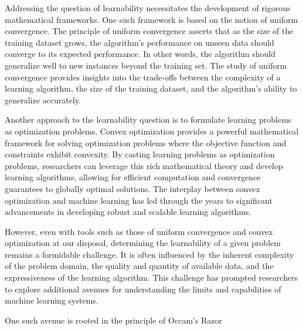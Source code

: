 Addressing the question of learnability necessitates the development of rigorous mathematical frameworks. One such framework is based on the notion of uniform convergence. 
The principle of uniform convergence asserts that as the size of the training dataset grows, the algorithm's performance on unseen data should converge to its expected performance.
In other words, the algorithm should generalize well to new instances beyond the training set. The study of uniform convergence provides insights into the trade-offs between the complexity of a learning algorithm, the size of the training dataset, and the algorithm's ability to generalize accurately.

Another approach to the learnability question is to formulate learning problems as optimization problems. 
Convex optimization provides a powerful mathematical framework for solving optimization problems where the objective function and constraints exhibit convexity.
By casting learning problems as optimization problems, researchers can leverage this rich mathematical theory and develop learning algorithms, allowing for efficient computation and convergence guarantees to globally optimal solutions.
The interplay between convex optimization and machine learning has led through the years to significant advancements in developing robust and scalable learning algorithms.

However, even with tools such as those of uniform convergence and convex optimization at our disposal, determining the learnability of a given problem remains a formidable challenge. 
It is often influenced by the inherent complexity of the problem domain, the quality and quantity of available data, and the expressiveness of the learning algorithm. 
This challenge has prompted researchers to explore additional avenues for understanding the limits and capabilities of machine learning systems.

One such avenue is rooted in the principle of Occam's Razor
